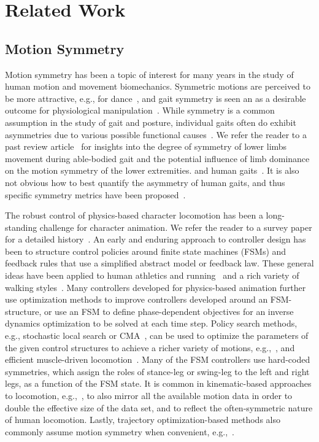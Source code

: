 \chapter{Related Work}
\label{ch:relatedwork}


\section{Motion Symmetry}
Motion symmetry has been a topic of interest for many years in the study of human motion and movement biomechanics. 
Symmetric motions are perceived to be more attractive, e.g., for dance~\cite{danceSymmetry},
and gait symmetry is seen an as a desirable outcome for physiological manipulation~\cite{robinson1987use}.
While symmetry is a common assumption in the study of gait and posture, 
individual gaits often do exhibit asymmetries due to various possible functional causes~\cite{seelet}.
We refer the reader to a past review article~\cite{SADEGHI200034} for insights
into the degree of symmetry of lower limbs movement during able-bodied gait
and the potential influence of limb dominance on the motion symmetry of the lower extremities.
and human gaits~\cite{riskowski}.
It is also not obvious how to best quantify 
the asymmetry of human gaits, and thus specific symmetry metrics have been
proposed~\cite{symmetry_measures,symmetry_phase_portrait}.

The robust control of physics-based character locomotion has been a long-standing challenge
for character animation. We refer the reader to a survey paper for a detailed history~\cite{STAR2012}.  
An early and enduring approach to controller design has been to structure control policies around finite state
machines (FSMs) and feedback rules that use a simplified abstract model or feedback law.  These general
ideas have been applied to human athletics and running~\cite{Hodgins95} and a rich variety of walking
styles~\cite{Yin07,Coros10,LeeYS10}. Many controllers developed for physics-based animation
further use optimization methods to improve controllers developed around an FSM-structure, or use an FSM to 
define phase-dependent objectives for an inverse dynamics optimization to be solved at each time step.
Policy search methods, e.g., stochastic local search or CMA~\cite{Hansen06}, can be used to optimize the 
parameters of the given control structures to achieve a richer variety of motions, e.g.,~\cite{Yin07,Coros11}, and
efficient muscle-driven locomotion~\cite{Wang09}.  
Many of the FSM controllers use hard-coded symmetries, which assign the roles of stance-leg or swing-leg
to the left and right legs, as a function of the FSM state.
It is common in kinematic-based approaches to locomotion, e.g.,~\cite{bruderlin,HoldenPFNN}, 
to also mirror all the available motion data
in order to double the effective size of the data set, and to reflect the often-symmetric nature of human locomotion.
Lastly, trajectory optimization-based methods also commonly assume motion symmetry when convenient, e.g.,~\cite{majkowska2007flipping}.

